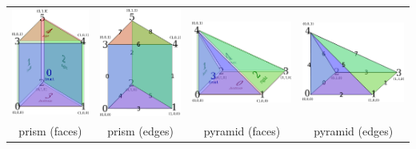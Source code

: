 \documentclass[aspectratio=169,11pt]{beamer}
\theoremstyle{definition}
\begin{document}
\begin{frame}[fragile]
\begin{onlyenv}
\begin{center}
\begin{tabular}{cccc}
      \end{tabular}
    \end{center}
    \begin{center}
      \begin{tabular}{cccc}
        \includegraphics[height=0.23\linewidth]{gg_prism} &
        \includegraphics[height=0.23\linewidth]{gg_prism_edges} &
        \includegraphics[height=0.23\linewidth]{gg_pyramid} &
        \includegraphics[height=0.23\linewidth]{gg_pyramid_edges}
        \\
        prism (faces) & prism (edges) & pyramid (faces) & pyramid (edges)\\
      \end{tabular}
    \end{center}
  \end{onlyenv}
\end{frame}
\end{document}
